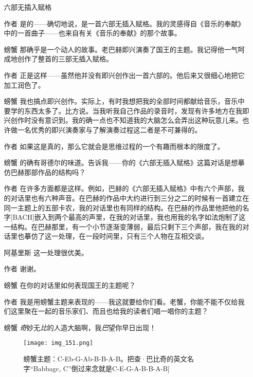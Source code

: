 \begin{dialog}{六部无插入赋格}
\begin{dialogue}
\item[作者]是的——确切地说，是一首六部无插入赋格。我的灵感得自《音乐的奉献》中的一首曲子——也来自有关《音乐的奉献》的那个故事。

\item[螃蟹]那确乎是一个动人的故事。老巴赫即兴演奏了国王的主题。我记得他一气呵成地创作了整首的三部无插入赋格。

\item[作者]正是这样——虽然他并没有即兴创作出一首六部的。他后来又很细心地把它加工润色了。

\item[螃蟹]我也搞点即兴创作。实际上，有时我想把我的全部时间都献给音乐，音乐中要学的东西太多了。比方说。当我听我自己作品的录音时，发现有许多地方在我即兴创作时没有意识到。我的确一点也不知道我的大脑怎么会弄出这种玩意儿来。也许做一名优秀的即兴演奏家与了解演奏过程这二者是不可兼得的。

\item[作者]如果这是真的，那么它就会是思维过程的一个有趣而根本的限度了。

\item[螃蟹]的确有哥德尔的味道。告诉我——你的《六部无插入赋格》这篇对话是想摹仿巴赫那部作品的结构吗？

\item[作者]在许多方面都是这样。例如，巴赫的《六部无插入赋格》中有六个声部，我的对话里也有六种声音。在巴赫的作品中大约进行到三分之二的时候有一首建立在同一主题上的五部卡农，我的对话里也有同样的结构。在巴赫的作品里他把他的名字[BACH]嵌入到两个最高的声里，在我的对话里，我也用我的名字如法炮制了这一结构。在巴赫那里，有一个小节逐渐变薄弱，最后只剩下三个声部，我在我的对话里也摹仿了这一处理，在一段时间里，只有三个人物在互相交谈。

\item[阿基里斯]这一处理很优美。

\item[作者]谢谢。

\item[螃蟹]在你的对话里如何表现国王的主题呢？

\item[作者]我是用螃蟹主题来表现的——我这就要给你们看。老蟹，你能不能不仅给我们这里聚在一起的音乐家们、而且也给我的读者们唱一唱你的主题？

\item[螃蟹]\emph{奇}妙无\emph{比}的人造大脑啊，我\emph{巴}望你早日出现！

\begin{figure}
\texttt{[image: img\_151.png]}
\caption[螃蟹主题。]
  {螃蟹主题：C-Eb-G-Ab-B-B-A-B。把查·巴比奇的英文名字“Babbagc, C”倒过来念就是C-E-G-A-B-B-A-B]}
\end{figure}


\end{dialogue}
\end{dialog}
